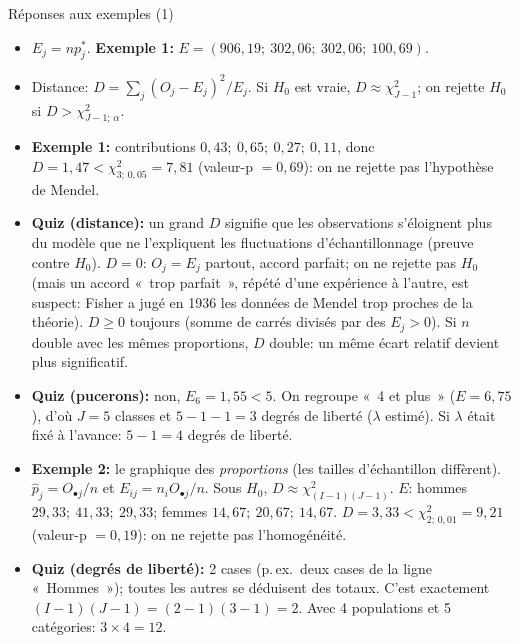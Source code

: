 \documentclass{BeamerTemplate}
\begin{document}
\begin{frame}[t]{Réponses aux exemples (1)}

\scriptsize
\begin{itemize}\itemsep1mm
  \item $E_j=np_j^*$. \textbf{Exemple 1:} $E=(906{,}19;\ 302{,}06;\ 302{,}06;\ 100{,}69)$.
  \item Distance: $D=\sum_j (O_j-E_j)^2/E_j$. Si $H_0$ est vraie,
  $D\approx\chi^2_{J-1}$; on rejette $H_0$ si $D>\chi^2_{J-1;\,\alpha}$.
  \item \textbf{Exemple 1:} contributions $0{,}43;\ 0{,}65;\ 0{,}27;\ 0{,}11$, donc
  $D=1{,}47<\chi^2_{3;\,0{,}05}=7{,}81$ (valeur-p $=0{,}69$): on ne rejette pas
  l'hypothèse de Mendel.
  \item \textbf{Quiz (distance):} un grand $D$ signifie que les observations
  s'éloignent plus du modèle que ne l'expliquent les fluctuations d'échantillonnage
  (preuve contre $H_0$). $D=0$: $O_j=E_j$ partout, accord parfait; on ne rejette pas
  $H_0$ (mais un accord «~trop parfait~», répété d'une expérience à l'autre, est
  suspect: Fisher a jugé en 1936 les données de Mendel trop proches de la théorie).
  $D\ge0$ toujours (somme de carrés divisés par des $E_j>0$). Si $n$ double avec les
  mêmes proportions, $D$ double: un même écart relatif devient plus significatif.
  \item \textbf{Quiz (pucerons):} non, $E_6=1{,}55<5$. On regroupe «~4 et plus~»
  ($E=6{,}75$), d'où $J=5$ classes et $5-1-1=3$ degrés de liberté ($\lambda$ estimé).
  Si $\lambda$ était fixé à l'avance: $5-1=4$ degrés de liberté.
  \item \textbf{Exemple 2:} le graphique des \emph{proportions} (les tailles
  d'échantillon diffèrent). $\hat p_j=O_{\bullet j}/n$ et
  $E_{ij}=n_iO_{\bullet j}/n$. Sous $H_0$, $D\approx\chi^2_{(I-1)(J-1)}$.
  $E$: hommes $29{,}33;\ 41{,}33;\ 29{,}33$; femmes $14{,}67;\ 20{,}67;\ 14{,}67$.
  $D=3{,}33<\chi^2_{2;\,0{,}01}=9{,}21$ (valeur-p $=0{,}19$): on ne rejette pas
  l'homogénéité.
  \item \textbf{Quiz (degrés de liberté):} 2 cases (p.\,ex.\ deux cases de la ligne
  «~Hommes~»); toutes les autres se déduisent des totaux. C'est exactement
  $(I-1)(J-1)=(2-1)(3-1)=2$. Avec 4 populations et 5 catégories: $3\times4=12$.
\end{itemize}

\end{frame}
\end{document}
